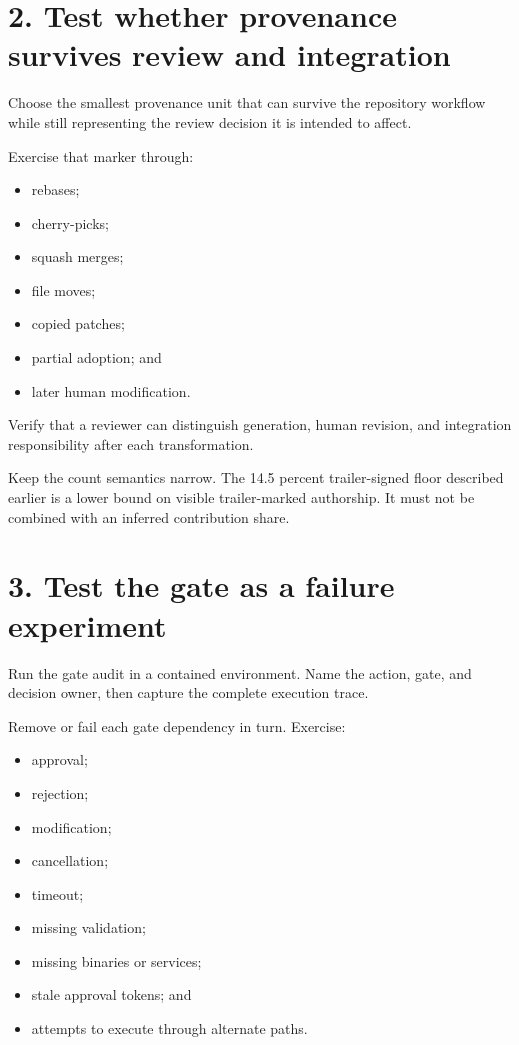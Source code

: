 \section{2. Test whether provenance survives review and integration}\label{test-whether-provenance-survives-review-and-integration}

Choose the smallest provenance unit that can survive the repository workflow while still representing the review decision it is intended to affect.

Exercise that marker through:

\begin{itemize}
\tightlist
\item
  rebases;
\item
  cherry-picks;
\item
  squash merges;
\item
  file moves;
\item
  copied patches;
\item
  partial adoption; and
\item
  later human modification.
\end{itemize}

Verify that a reviewer can distinguish generation, human revision, and integration responsibility after each transformation.

Keep the count semantics narrow. The 14.5 percent trailer-signed floor described earlier is a lower bound on visible trailer-marked authorship. It must not be combined with an inferred contribution share.

\section{3. Test the gate as a failure experiment}\label{test-the-gate-as-a-failure-experiment}

Run the gate audit in a contained environment. Name the action, gate, and decision owner, then capture the complete execution trace.

Remove or fail each gate dependency in turn. Exercise:

\begin{itemize}
\tightlist
\item
  approval;
\item
  rejection;
\item
  modification;
\item
  cancellation;
\item
  timeout;
\item
  missing validation;
\item
  missing binaries or services;
\item
  stale approval tokens; and
\item
  attempts to execute through alternate paths.
\end{itemize}

